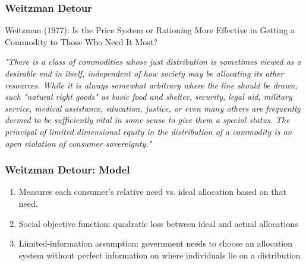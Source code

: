 \documentclass[aspectratio=169]{beamer}
\begin{document}
\begin{frame}
\frametitle{Weitzman Detour}
Weitzman (1977): Is the Price System or Rationing More Effective in Getting a Commodity to Those Who Need It Most? 

\small
\textit{"There is a class of commodities whose just distribution is sometimes viewed as a desirable end in itself, independent of how society may be allocating its other resources. While it is always somewhat arbitrary where the line should be drawn, such "natural right goods" as basic food and shelter, security, legal aid, military service, medical assistance, education, justice, or even many others are frequently deemed to be sufficiently vital in some sense to give them a special status. The principal of limited dimensional equity in the distribution of a commodity is an open violation of consumer sovereignty."}


\end{frame}

\begin{frame}
    \frametitle{Weitzman Detour: Model}
    \begin{enumerate}
        \item Measures each consumer's relative need vs. ideal allocation based on that need. \pause
        \item Social objective function: quadratic loss between ideal and actual allocations \pause
        \item Limited-information assumption: government needs to choose an allocation system without perfect information on where individuals lie on a distribution
    \end{enumerate}
    
    
\end{frame}
\end{document}
